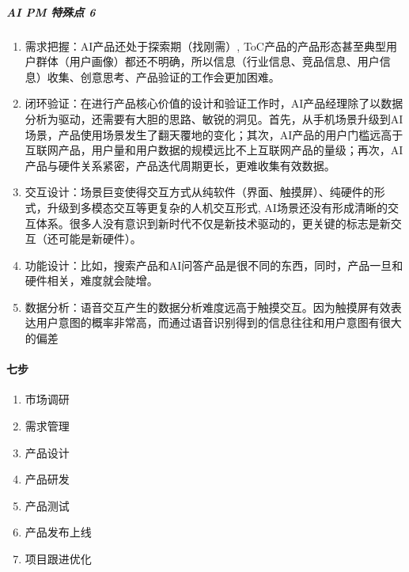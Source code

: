 \documentclass[letterpaper,10pt,english]{sphinxmanual}
\begin{document}
\subparagraph{AI PM 特殊点 6\sphinxfootnotemark[799]}
\label{\detokenize{chapter_project/process:ai-pm-6}}%
\begin{footnotetext}[799]\sphinxAtStartFootnote
{}
%
\end{footnotetext}\ignorespaces \begin{enumerate}
%
\item {} 
需求把握：AI产品还处于探索期（找刚需）,
ToC产品的产品形态甚至典型用户群体（用户画像）都还不明确，所以信息（行业信息、竞品信息、用户信息）收集、创意思考、产品验证的工作会更加困难。

\item {} 
闭环验证：在进行产品核心价值的设计和验证工作时，AI产品经理除了以数据分析为驱动，还需要有大胆的思路、敏锐的洞见。首先，从手机场景升级到AI场景，产品使用场景发生了翻天覆地的变化；其次，AI产品的用户门槛远高于互联网产品，用户量和用户数据的规模远比不上互联网产品的量级；再次，AI产品与硬件关系紧密，产品迭代周期更长，更难收集有效数据。

\item {} 
交互设计：场景巨变使得交互方式从纯软件（界面、触摸屏）、纯硬件的形式，升级到多模态交互等更复杂的人机交互形式,
AI场景还没有形成清晰的交互体系。很多人没有意识到新时代不仅是新技术驱动的，更关键的标志是新交互（还可能是新硬件）。

\item {} 
功能设计：比如，搜索产品和AI问答产品是很不同的东西，同时，产品一旦和硬件相关，难度就会陡增。

\item {} 
数据分析：语音交互产生的数据分析难度远高于触摸交互。因为触摸屏有效表达用户意图的概率非常高，而通过语音识别得到的信息往往和用户意图有很大的偏差

\end{enumerate}


\paragraph{七步}
\label{\detokenize{chapter_project/process:id5}}\begin{enumerate}
%
\item {} 
市场调研

\item {} 
需求管理

\item {} 
产品设计

\item {} 
产品研发

\item {} 
产品测试

\item {} 
产品发布上线

\item {} 
项目跟进优化

\end{enumerate}
\end{document}
